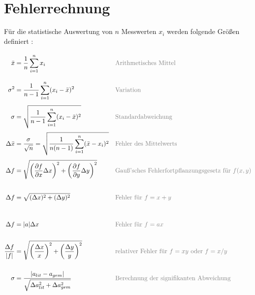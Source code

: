 \onecolumn
\section{Fehlerrechnung}
Für die statistische Auswertung von $n$ Messwerten $x_i$ werden folgende Größen definiert \cite{errorSkript25}:
\begin{align}
    \bar{x} &= \frac{1}{n} \sum_{i=1}^{n} x_i \vphantom{\sqrt{\sum_i^n}^2} && \text{\textcolor{gray}{Arithmetisches Mittel}}\\
    \sigma^2 &= \frac{1}{n-1} \sum_{i=1}^{n} (x_i - \bar{x})^2 \vphantom{\sqrt{\sum_i^n}^2} && \text{\textcolor{gray}{Variation}}\\
    \sigma &= \sqrt{\frac{1}{n-1} \sum_{i=1}^{n} (x_i - \bar{x})^2} \vphantom{\sqrt{\sum_i^n}^2} && \text{\textcolor{gray}{Standardabweichung}}\\
    \Delta \bar{x} &= \frac{\sigma}{\sqrt{n}} = \sqrt{\frac{1}{n(n-1)} \sum_{i=1}^n(\bar x - x_i)^2} \vphantom{\sqrt{\sum_i^n}^2} && \text{\textcolor{gray}{Fehler des Mittelwerts}}\\
    \Delta f &= \sqrt{\left(\frac{\partial f}{\partial x} \Delta x\right)^2 + \left(\frac{\partial f}{\partial y} \Delta y\right)^2} \vphantom{\sqrt{\sum_i^n}^2} && \text{\textcolor{gray}{Gauß’sches Fehlerfortpflanzungsgesetz für $f(x,y)$}}\\
    \Delta f &= \sqrt{(\Delta x)^2 + (\Delta y)^2} \vphantom{\sqrt{\sum_i^n}^2} && \text{\textcolor{gray}{Fehler für $f = x + y$}}\\
    \Delta f &= |a| \Delta x \vphantom{\sqrt{\sum_i^n}^2} && \text{\textcolor{gray}{Fehler für $f = ax$}}\\
    \frac{\Delta f}{|f|} &= \sqrt{\left(\frac{\Delta x}{x}\right)^2 + \left(\frac{\Delta y}{y}\right)^2} \vphantom{\sqrt{\sum_i^n}^2} && \text{\textcolor{gray}{relativer Fehler für $f = xy$ oder $f = x/y$}}\\
    \sigma &= \frac{|a_{lit} - a_{gem}|}{\sqrt{\Delta a_{lit}^2 + \Delta a_{gem}^2}} \vphantom{\sqrt{\sum_i^n}^2} && \text{\textcolor{gray}{Berechnung der signifikanten Abweichung}}
\end{align}


